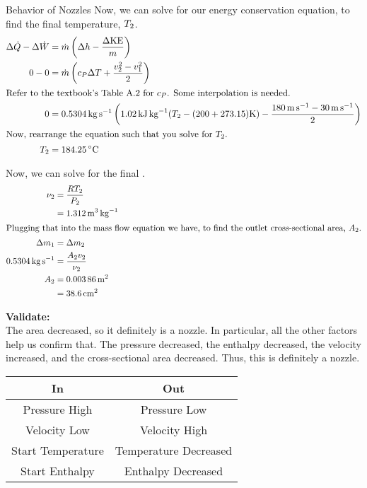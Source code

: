 \begin{example}{Behavior of Nozzles}
  Now, we can solve for our energy conservation equation,  to find the final temperature, $T_{2}$.
  \begin{align*}
    \Change{\FlowRate{\Heat}} - \Change{\FlowRate{\Work}} &= \FlowRate{\Mass} \left( \Change{\SpecificEnthalpy} - \frac{\Change{\KineticEnergy}}{\Mass} \right) \\
    0 - 0 &= \FlowRate{\Mass} \left(\SpecificHeatPressure \Change{\Temp} + \frac{\Velocity_{2}^{2} - \Velocity_{1}^{2}}{2} \right) \\
    \intertext{Refer to the textbook's Table A.2 for $\SpecificHeatPressure$. Some interpolation is needed.}
    0 &= \SI{0.5304}{\kilo\gram\per\second} \left( \SI{1.02}{\kilo\joule\per\kilo\gram} (\Temp_{2} - (200 + 273.15)\si{\kelvin}) - \frac{\SI{180}{\meter\per\second} - \SI{30}{\meter\per\second}}{2} \right) \\
    \intertext{Now, rearrange the equation such that you solve for $\Temp_{2}$.}
    \Temp_{2} &= \SI{184.25}{\degreeCelsius}
  \end{align*}

  Now, we can solve for the final .
  \begin{align*}
    \nu_{2} &= \frac{R T_{2}}{P_{2}} \\
                        &= \SI{1.312}{\meter\cubed\per\kilo\gram} \\
    \intertext{Plugging that into the mass flow equation we have, to find the outlet cross-sectional area, $A_{2}$.}
    \Delta m_{1} &= \Delta m_{2} \\
    \SI{0.5304}{\kilo\gram\per\second} &= \frac{A_{2} v_{2}}{\nu_{2}} \\
    A_{2} &= \SI{0.00386}{\meter\squared} \\
                        &= \SI{38.6}{\centi\meter\squared}
  \end{align*}

  \textbf{Validate:} \\
  The area decreased, so it definitely is a nozzle.
  In particular, all the other factors help us confirm that.
  The pressure decreased, the enthalpy decreased, the velocity increased, and the cross-sectional area decreased.
  Thus, this is definitely a nozzle.
  \begin{center}
    \begin{tabular}{c|c}
      \toprule
      In & Out \\
      \midrule
      Pressure High & Pressure Low \\
      Velocity Low & Velocity High \\
      Start Temperature & Temperature Decreased \\
      Start Enthalpy & Enthalpy Decreased \\
      \bottomrule
    \end{tabular}
  \end{center}


\end{example}
